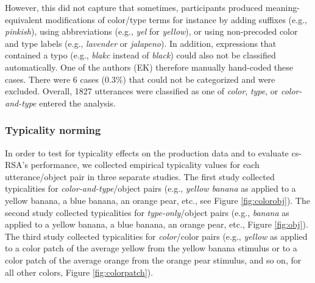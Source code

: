 \documentclass[11pt]{article}
\newcommand{\figref}[1]{Figure \ref{#1}}
\begin{document}
However, this did not capture that sometimes, participants produced meaning-equivalent modifications of color/type terms for instance by adding suffixes (e.g., \emph{pinkish}), using abbreviations (e.g., \emph{yel} for \emph{yellow}), or using non-precoded color and type labels (e.g., \emph{lavender} or \emph{jalapeno}). In addition, expressions that contained a typo (e.g., \emph{blakc} instead of \emph{black}) could also not be classified automatically. One of the authors (EK) therefore manually hand-coded these cases.
There were 6 cases (0.3\%) that could not be categorized and were excluded.
Overall, 1827 utterances were classified as one of \emph{color}, \emph{type}, or \emph{color-and-type} entered the analysis.


\subsubsection{Typicality norming}
\label{sec:typicalitynormingcolor}

In order to test for typicality effects on the production data and to evaluate cs-RSA's performance, we collected empirical typicality values for each utterance/object pair in three separate studies. The first study collected typicalities for \emph{color-and-type}/object pairs (e.g., \emph{yellow banana} as applied to a yellow banana, a blue banana, an orange pear, etc., see \figref{fig:colorobj}). The second study collected typicalities for \emph{type-only}/object pairs (e.g., \emph{banana} as applied to a yellow banana, a blue banana, an orange pear, etc., \figref{fig:obj}). The third study collected typicalities for \emph{color}/color pairs (e.g., \emph{yellow} as applied to a color patch of the average yellow from the yellow banana stimulus or to a color patch of the average orange from the orange pear stimulus, and so on, for all other colors, \figref{fig:colorpatch}). 
\end{document}
